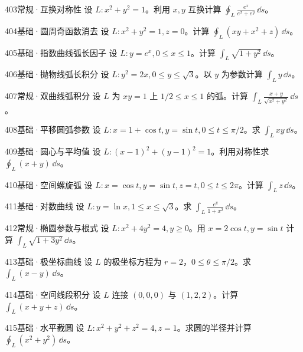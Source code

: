 \begin{exercise}{403}{常规·互换对称性}
设 $L:x^2+y^2=1$。利用 $x,y$ 互换计算 $\oint_L\frac{e^x}{e^x+e^y}\,\dd s$。
\end{exercise}
\begin{exercise}{404}{基础·圆周奇函数消去}
设 $L:x^2+y^2=1,z=0$。计算 $\oint_L(xy+x^2+z)\,\dd s$。
\end{exercise}
\begin{exercise}{405}{基础·指数曲线弧长因子}
设 $L:y=e^x,0\leq x\leq1$。计算 $\int_L\sqrt{1+y^2}\,\dd s$。
\end{exercise}
\begin{exercise}{406}{基础·抛物线弧长积分}
设 $L:y^2=2x,0\leq y\leq\sqrt3$。以 $y$ 为参数计算 $\int_Ly\,\dd s$。
\end{exercise}
\begin{exercise}{407}{常规·双曲线弧积分}
设 $L$ 为 $xy=1$ 上 $1/2\leq x\leq1$ 的弧。计算 $\int_L\frac{x+y}{\sqrt{x^2+y^2}}\,\dd s$。
\end{exercise}
\begin{exercise}{408}{基础·平移圆弧参数}
设 $L:x=1+\cos t,y=\sin t,0\leq t\leq\pi/2$。求 $\int_Lxy\,\dd s$。
\end{exercise}
\begin{exercise}{409}{基础·圆心与平均值}
设 $L:(x-1)^2+(y-1)^2=1$。利用对称性求 $\oint_L(x+y)\,\dd s$。
\end{exercise}
\begin{exercise}{410}{基础·空间螺旋弧}
设 $L:x=\cos t,y=\sin t,z=t,0\leq t\leq2\pi$。计算 $\int_Lz\,\dd s$。
\end{exercise}
\begin{exercise}{411}{基础·对数曲线}
设 $L:y=\ln x,1\leq x\leq\sqrt3$。求 $\int_L\frac{e^y}{1+x^2}\,\dd s$。
\end{exercise}
\begin{exercise}{412}{常规·椭圆参数与根式}
设 $L:x^2+4y^2=4,y\geq0$。用 $x=2\cos t,y=\sin t$ 计算 $\int_L\sqrt{1+3y^2}\,\dd s$。
\end{exercise}
\begin{exercise}{413}{基础·极坐标曲线}
设 $L$ 的极坐标方程为 $r=2$，$0\leq\theta\leq\pi/2$。求 $\int_L(x-y)\,\dd s$。
\end{exercise}
\begin{exercise}{414}{基础·空间线段积分}
设 $L$ 连接 $(0,0,0)$ 与 $(1,2,2)$。计算 $\int_L(x+y+z)\,\dd s$。
\end{exercise}
\begin{exercise}{415}{基础·水平截圆}
设 $L:x^2+y^2+z^2=4,z=1$。求圆的半径并计算 $\oint_L(x^2+y^2)\,\dd s$。
\end{exercise}
